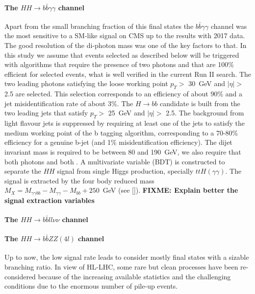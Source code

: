 \paragraph{The $HH \rightarrow b\bar{b}\gamma\gamma$ channel}

Apart from the small branching fraction of this final states the $b\bar{b}\gamma\gamma$ channel was the most sensitive to a SM-like signal on CMS up to the results with 2017 data. The good resolution of the di-photon mass was one of the key factors to that. 
In this study we assume that events selected as described below will be triggered with algorithms that require the presence of two photons and that are 100\% efficient for selected events, what is well verified in the current Run II search. 
The two leading photons satisfying the loose working point $p_T >$ 30~GeV and $|\eta| >$ 2.5 are selected. This selection corresponds to an efficiency of about 90\%  and a jet misidentification rate of about 3\%. The $H \rightarrow bb$ candidate is built from the two leading jets that satisfy $p_T >$ 25~GeV and $|\eta| >$ 2.5. The background from light flavour jets is suppressed by requiring at least one of the jets to satisfy the medium working point of the b tagging algorithm, corresponding to a 70-80\% efficiency for a genuine b-jet (and 1\% misidentification efficiency). The dijet invariant mass is required to be between 80 and 190~GeV, we also require that both photons and both . A multivariate variable (BDT) is constructed to separate the $HH$ signal from single Higgs production, specially $ttH(\gamma\gamma)$. The signal is extracted by the four body reduced mass $M_{X} = M_{\gamma\gamma bb} - M_{\gamma\gamma} - M_{bb} + 250$~GeV (see []). {\bf FIXME: Explain better the signal extraction variables}


\paragraph{The $HH \rightarrow b\bar{b}ll\nu\nu$ channel}



\paragraph{The $HH \rightarrow b\bar{b}ZZ(4l)$ channel}

Up to now, the low signal rate leads to consider mostly final states with a sizable branching ratio. In view of HL-LHC, some rare but clean processes have been re-considered because of the increasing available statistics and the challenging conditions due to the enormous number of pile-up events. 

